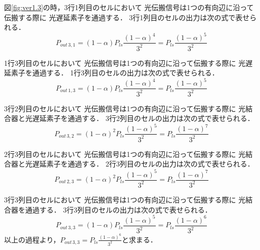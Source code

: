 \begin{itemize}
図\ref{fig:ver1.3}の時，3行1列目のセルにおいて
光伝搬信号は1つの有向辺に沿って伝搬する際に
光遅延素子を通過する．
3行1列目のセルの出力は次の式で表せられる．
$$
P_{out\,3,1}=(1-\alpha)P_{ls}\frac{(1-\alpha)^4}{3^2}=P_{ls}\frac{(1-\alpha)^5}{3^2}
$$

1行3列目のセルにおいて
光伝搬信号は1つの有向辺に沿って伝搬する際に
光遅延素子を通過する．
1行3列目のセルの出力は次の式で表せられる． 
$$
P_{out\,1,3}=(1-\alpha)P_{ls}\frac{(1-\alpha)^4}{3^2}=P_{ls}\frac{(1-\alpha)^5}{3^2}
$$

3行2列目のセルにおいて
光伝搬信号は1つの有向辺に沿って伝搬する際に
光結合器と光遅延素子を通過する．
3行2列目のセルの出力は次の式で表せられる． 
$$
P_{out\,3,2}=(1-\alpha)^2 P_{ls}\frac{(1-\alpha)^5}{3^2}=P_{ls}\frac{(1-\alpha)^7}{3^2}
$$

2行3列目のセルにおいて
光伝搬信号は1つの有向辺に沿って伝搬する際に
光結合器と光遅延素子を通過する．
2行3列目のセルの出力は次の式で表せられる．
$$
P_{out\,2,3}=(1-\alpha)^2 P_{ls}\frac{(1-\alpha)^5}{3^2}=P_{ls}\frac{(1-\alpha)^7}{3^2}
$$

3行3列目のセルにおいて
光伝搬信号は1つの有向辺に沿って伝搬する際に
光結合器を通過する．
3行3列目のセルの出力は次の式で表せられる．
$$
P_{out\,3,3}=(1-\alpha)P_{ls}\frac{(1-\alpha)^5}{3^2}
=P_{ls}\frac{(1-\alpha)^6}{3^2}
$$
以上の過程より，$P_{out\,3,3}=P_{ls}\frac{(1-\alpha)^6}{3^2}$と求まる．


\end{itemize}
